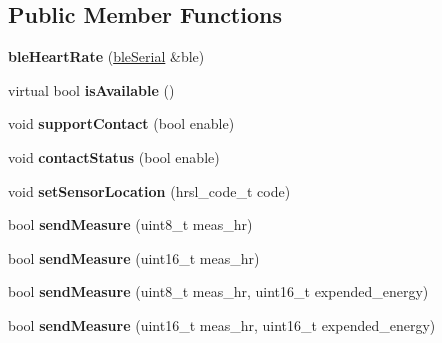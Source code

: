 \subsection*{Public Member Functions}
\begin{DoxyCompactItemize}
\item 
\hypertarget{classble_heart_rate_af5e0bc81b5d2f8e290b6cba8050f80c2}{{\bfseries ble\-Heart\-Rate} (\hyperlink{classble_serial}{ble\-Serial} \&ble)}\label{classble_heart_rate_af5e0bc81b5d2f8e290b6cba8050f80c2}

\item 
\hypertarget{classble_heart_rate_a822019806bf50f6d25ae075b62a838ab}{virtual bool {\bfseries is\-Available} ()}\label{classble_heart_rate_a822019806bf50f6d25ae075b62a838ab}

\item 
\hypertarget{classble_heart_rate_acd5a0148a2df6692893a274a18710431}{void {\bfseries support\-Contact} (bool enable)}\label{classble_heart_rate_acd5a0148a2df6692893a274a18710431}

\item 
\hypertarget{classble_heart_rate_a4b05ceb33ffe7fcfe9f1a3dbf9679882}{void {\bfseries contact\-Status} (bool enable)}\label{classble_heart_rate_a4b05ceb33ffe7fcfe9f1a3dbf9679882}

\item 
\hypertarget{classble_heart_rate_a9c822ea4fafcb609e009427feb0949c2}{void {\bfseries set\-Sensor\-Location} (hrsl\-\_\-code\-\_\-t code)}\label{classble_heart_rate_a9c822ea4fafcb609e009427feb0949c2}

\item 
\hypertarget{classble_heart_rate_a2b7329b1756f03c99334b6575e14c090}{bool {\bfseries send\-Measure} (uint8\-\_\-t meas\-\_\-hr)}\label{classble_heart_rate_a2b7329b1756f03c99334b6575e14c090}

\item 
\hypertarget{classble_heart_rate_a9f69ad22553dabc5b992bf9a15aa6667}{bool {\bfseries send\-Measure} (uint16\-\_\-t meas\-\_\-hr)}\label{classble_heart_rate_a9f69ad22553dabc5b992bf9a15aa6667}

\item 
\hypertarget{classble_heart_rate_ac0bd83937f2997c2451918a421c277c2}{bool {\bfseries send\-Measure} (uint8\-\_\-t meas\-\_\-hr, uint16\-\_\-t expended\-\_\-energy)}\label{classble_heart_rate_ac0bd83937f2997c2451918a421c277c2}

\item 
\hypertarget{classble_heart_rate_a34a055d4b926b2447ca78a4f63691d30}{bool {\bfseries send\-Measure} (uint16\-\_\-t meas\-\_\-hr, uint16\-\_\-t expended\-\_\-energy)}\label{classble_heart_rate_a34a055d4b926b2447ca78a4f63691d30}


\end{DoxyCompactItemize}
